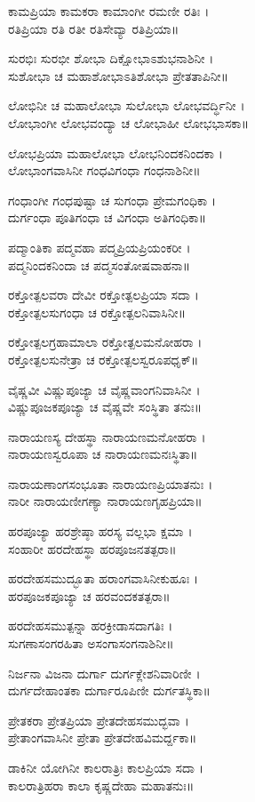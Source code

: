 ಕಾಮಪ್ರಿಯಾ ಕಾಮಕರಾ ಕಾಮಾಂಗೀ ರಮಣೀ ರತಿಃ ।\\
ರತಿಪ್ರಿಯಾ ರತಿ ರತೀ ರತಿಸೇವ್ಯಾ ರತಿಪ್ರಿಯಾ॥

ಸುರಭಿಃ ಸುರಭೀ ಶೋಭಾ ದಿಕ್ಷೋಭಾಽಶುಭನಾಶಿನೀ ।\\
ಸುಶೋಭಾ ಚ ಮಹಾಶೋಭಾಽತಿಶೋಭಾ ಪ್ರೇತತಾಪಿನೀ॥

ಲೋಭಿನೀ ಚ ಮಹಾಲೋಭಾ ಸುಲೋಭಾ ಲೋಭವರ್ದ್ಧಿನೀ ।\\
ಲೋಭಾಂಗೀ ಲೋಭವಂದ್ಯಾ ಚ ಲೋಭಾಹೀ ಲೋಭಭಾಸಕಾ॥

ಲೋಭಪ್ರಿಯಾ ಮಹಾಲೋಭಾ ಲೋಭನಿಂದಕನಿಂದಕಾ ।\\
ಲೋಭಾಂಗವಾಸಿನೀ ಗಂಧವಿಗಂಧಾ ಗಂಧನಾಶಿನೀ॥

ಗಂಧಾಂಗೀ ಗಂಧಪುಷ್ಟಾ ಚ ಸುಗಂಧಾ ಪ್ರೇಮಗಂಧಿಕಾ ।\\
ದುರ್ಗಂಧಾ ಪೂತಿಗಂಧಾ ಚ ವಿಗಂಧಾ ಅತಿಗಂಧಿಕಾ॥

ಪದ್ಮಾಂತಿಕಾ ಪದ್ಮವಹಾ ಪದ್ಮಪ್ರಿಯಪ್ರಿಯಂಕರೀ ।\\
ಪದ್ಮನಿಂದಕನಿಂದಾ ಚ ಪದ್ಮಸಂತೋಷವಾಹನಾ॥

ರಕ್ತೋತ್ಪಲವರಾ ದೇವೀ ರಕ್ತೋತ್ಪಲಪ್ರಿಯಾ ಸದಾ ।\\
ರಕ್ತೋತ್ಪಲಸುಗಂಧಾ ಚ ರಕ್ತೋತ್ಪಲನಿವಾಸಿನೀ॥

ರಕ್ತೋತ್ಪಲಗ್ರಹಾಮಾಲಾ ರಕ್ತೋತ್ಪಲಮನೋಹರಾ ।\\
ರಕ್ತೋತ್ಪಲಸುನೇತ್ರಾ ಚ ರಕ್ತೋತ್ಪಲಸ್ವರೂಪಧೃಕ್॥

ವೈಷ್ಣವೀ ವಿಷ್ಣುಪೂಜ್ಯಾ ಚ ವೈಷ್ಣವಾಂಗನಿವಾಸಿನೀ ।\\
ವಿಷ್ಣುಪೂಜಕಪೂಜ್ಯಾ ಚ ವೈಷ್ಣವೇ ಸಂಸ್ಥಿತಾ ತನುಃ॥

ನಾರಾಯಣಸ್ಯ ದೇಹಸ್ಥಾ ನಾರಾಯಣಮನೋಹರಾ ।\\
ನಾರಾಯಣಸ್ವರೂಪಾ ಚ ನಾರಾಯಣಮನಃಸ್ಥಿತಾ॥

ನಾರಾಯಣಾಂಗಸಂಭೂತಾ ನಾರಾಯಣಪ್ರಿಯಾತನುಃ ।\\
ನಾರೀ ನಾರಾಯಣೀಗಣ್ಯಾ ನಾರಾಯಣಗೃಹಪ್ರಿಯಾ॥

ಹರಪೂಜ್ಯಾ ಹರಶ್ರೇಷ್ಠಾ ಹರಸ್ಯ ವಲ್ಲಭಾ ಕ್ಷಮಾ ।\\
ಸಂಹಾರೀ ಹರದೇಹಸ್ಥಾ ಹರಪೂಜನತತ್ಪರಾ॥

ಹರದೇಹಸಮುದ್ಭೂತಾ ಹರಾಂಗವಾಸಿನೀಕುಹೂಃ ।\\
ಹರಪೂಜಕಪೂಜ್ಯಾ ಚ ಹರವಂದಕತತ್ಪರಾ॥

ಹರದೇಹಸಮುತ್ಪನ್ನಾ ಹರಕ್ರೀಡಾಸದಾಗತಿಃ ।\\
ಸುಗಣಾಸಂಗರಹಿತಾ ಅಸಂಗಾಸಂಗನಾಶಿನೀ॥

ನಿರ್ಜನಾ ವಿಜನಾ ದುರ್ಗಾ ದುರ್ಗಕ್ಲೇಶನಿವಾರಿಣೀ ।\\
ದುರ್ಗದೇಹಾಂತಕಾ ದುರ್ಗಾರೂಪಿಣೀ ದುರ್ಗತಸ್ಥಿಕಾ॥

ಪ್ರೇತಕರಾ ಪ್ರೇತಪ್ರಿಯಾ ಪ್ರೇತದೇಹಸಮುದ್ಭವಾ ।\\
ಪ್ರೇತಾಂಗವಾಸಿನೀ ಪ್ರೇತಾ ಪ್ರೇತದೇಹವಿಮರ್ದ್ದಕಾ॥

ಡಾಕಿನೀ ಯೋಗಿನೀ ಕಾಲರಾತ್ರಿಃ ಕಾಲಪ್ರಿಯಾ ಸದಾ ।\\
ಕಾಲರಾತ್ರಿಹರಾ ಕಾಲಾ ಕೃಷ್ಣದೇಹಾ ಮಹಾತನುಃ॥

